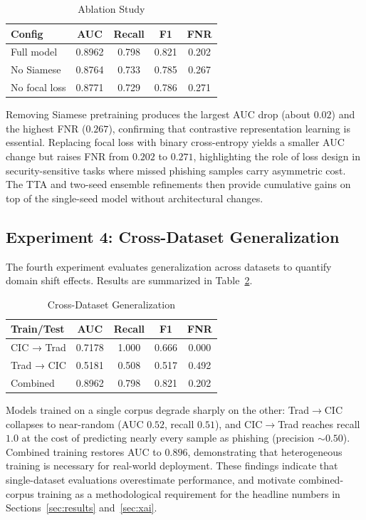 \documentclass[conference]{IEEEtran}
\begin{document}
\begin{table}[!htbp]
\caption{Ablation Study}
\label{tab:ablation}
\centering
\small
\begin{tabular}{lcccc}
\toprule
\textbf{Config} & \textbf{AUC} & \textbf{Recall} & \textbf{F1} & \textbf{FNR} \\
\midrule
Full model & 0.8962 & 0.798 & 0.821 & 0.202 \\
No Siamese & 0.8764 & 0.733 & 0.785 & 0.267 \\
No focal loss & 0.8771 & 0.729 & 0.786 & 0.271 \\
\bottomrule
\end{tabular}
\end{table}
Removing Siamese pretraining produces the largest AUC drop (about $0.02$) and the highest FNR ($0.267$), confirming that contrastive representation learning is essential. Replacing focal loss with binary cross-entropy yields a smaller AUC change but raises FNR from $0.202$ to $0.271$, highlighting the role of loss design in security-sensitive tasks where missed phishing samples carry asymmetric cost. The TTA and two-seed ensemble refinements then provide cumulative gains on top of the single-seed model without architectural changes.

\subsection{Experiment 4: Cross-Dataset Generalization}

The fourth experiment evaluates generalization across datasets to quantify domain shift effects. Results are summarized in Table~\ref{tab:cross}.

\begin{table}[htp]
\caption{Cross-Dataset Generalization}
\label{tab:cross}
\centering
\small
\begin{tabular}{lcccc}
\toprule
\textbf{Train/Test} & \textbf{AUC} & \textbf{Recall} & \textbf{F1} & \textbf{FNR} \\
\midrule
CIC → Trad & 0.7178 & 1.000 & 0.666 & 0.000 \\
Trad → CIC & 0.5181 & 0.508 & 0.517 & 0.492 \\
Combined & 0.8962 & 0.798 & 0.821 & 0.202 \\
\bottomrule
\end{tabular}
\end{table}

Models trained on a single corpus degrade sharply on the other: Trad$\to$CIC collapses to near-random (AUC $0.52$, recall $0.51$), and CIC$\to$Trad reaches recall $1.0$ at the cost of predicting nearly every sample as phishing (precision $\sim$$0.50$). Combined training restores AUC to $0.896$, demonstrating that heterogeneous training is necessary for real-world deployment. These findings indicate that single-dataset evaluations overestimate performance, and motivate combined-corpus training as a methodological requirement for the headline numbers in Sections~\ref{sec:results} and~\ref{sec:xai}.
\end{document}
